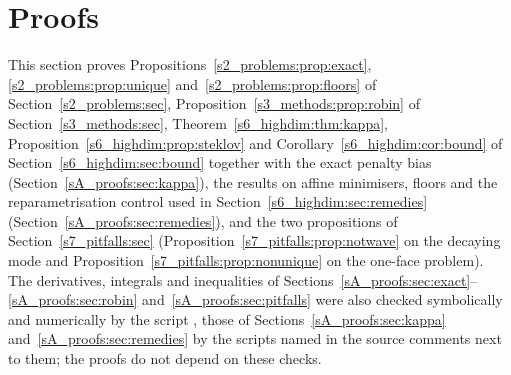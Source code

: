 \section{Proofs}\label{sA_proofs:sec}

This section proves Propositions~\ref{s2_problems:prop:exact},
\ref{s2_problems:prop:unique} and~\ref{s2_problems:prop:floors} of
Section~\ref{s2_problems:sec}, Proposition~\ref{s3_methods:prop:robin} of
Section~\ref{s3_methods:sec}, Theorem~\ref{s6_highdim:thm:kappa},
Proposition~\ref{s6_highdim:prop:steklov} and Corollary~\ref{s6_highdim:cor:bound} of
Section~\ref{s6_highdim:sec:bound} together with the exact penalty bias
(Section~\ref{sA_proofs:sec:kappa}), the results on affine minimisers, floors and the
reparametrisation control used in Section~\ref{s6_highdim:sec:remedies}
(Section~\ref{sA_proofs:sec:remedies}), and the two propositions of
Section~\ref{s7_pitfalls:sec} (Proposition~\ref{s7_pitfalls:prop:notwave} on the decaying mode
and Proposition~\ref{s7_pitfalls:prop:nonunique} on the one-face problem). The derivatives,
integrals and inequalities of Sections~\ref{sA_proofs:sec:exact}--\ref{sA_proofs:sec:robin}
and~\ref{sA_proofs:sec:pitfalls} were also checked symbolically and numerically by the script
, those of Sections~\ref{sA_proofs:sec:kappa}
and~\ref{sA_proofs:sec:remedies} by the scripts named in the source comments next to them; the
proofs do not depend on these checks.

